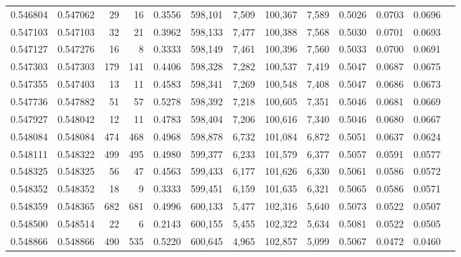 \begin{tabular}{rrrrrrrrrrrrr}
0.546804 & 0.547062 &    29 &    16 &                                     0.3556 & 598,101 &   7,509 & 100,367 &   7,589 & 0.5026 & 0.0703 & 0.0696 \\
0.547103 & 0.547103 &    32 &    21 &                                     0.3962 & 598,133 &   7,477 & 100,388 &   7,568 & 0.5030 & 0.0701 & 0.0693 \\
0.547127 & 0.547276 &    16 &     8 &                                     0.3333 & 598,149 &   7,461 & 100,396 &   7,560 & 0.5033 & 0.0700 & 0.0691 \\
0.547303 & 0.547303 &   179 &   141 &                                     0.4406 & 598,328 &   7,282 & 100,537 &   7,419 & 0.5047 & 0.0687 & 0.0675 \\
0.547355 & 0.547403 &    13 &    11 &                                     0.4583 & 598,341 &   7,269 & 100,548 &   7,408 & 0.5047 & 0.0686 & 0.0673 \\
0.547736 & 0.547882 &    51 &    57 &                                     0.5278 & 598,392 &   7,218 & 100,605 &   7,351 & 0.5046 & 0.0681 & 0.0669 \\
0.547927 & 0.548042 &    12 &    11 &                                     0.4783 & 598,404 &   7,206 & 100,616 &   7,340 & 0.5046 & 0.0680 & 0.0667 \\
0.548084 & 0.548084 &   474 &   468 &                                     0.4968 & 598,878 &   6,732 & 101,084 &   6,872 & 0.5051 & 0.0637 & 0.0624 \\
0.548111 & 0.548322 &   499 &   495 &                                     0.4980 & 599,377 &   6,233 & 101,579 &   6,377 & 0.5057 & 0.0591 & 0.0577 \\
0.548325 & 0.548325 &    56 &    47 &                                     0.4563 & 599,433 &   6,177 & 101,626 &   6,330 & 0.5061 & 0.0586 & 0.0572 \\
0.548352 & 0.548352 &    18 &     9 &                                     0.3333 & 599,451 &   6,159 & 101,635 &   6,321 & 0.5065 & 0.0586 & 0.0571 \\
0.548359 & 0.548365 &   682 &   681 &                                     0.4996 & 600,133 &   5,477 & 102,316 &   5,640 & 0.5073 & 0.0522 & 0.0507 \\
0.548500 & 0.548514 &    22 &     6 &                                     0.2143 & 600,155 &   5,455 & 102,322 &   5,634 & 0.5081 & 0.0522 & 0.0505 \\
0.548866 & 0.548866 &   490 &   535 &                                     0.5220 & 600,645 &   4,965 & 102,857 &   5,099 & 0.5067 & 0.0472 & 0.0460 \\

\end{tabular}
